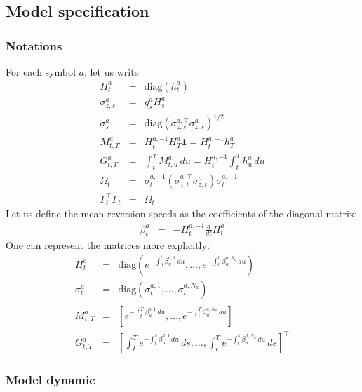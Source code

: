 \documentclass[11pt,english]{amsart}
\newcommand{\diag}{\mathrm{diag}}
\newcommand{\vun}{\mathbf{1}}
\theoremstyle{definition}
\begin{document}
\subsection{Model specification}%


\subsubsection{Notations}

For each symbol $a$, let us write
\begin{eqnarray}
  H^a_{t} &=& \diag(h^a_t)  \\
  \sigma^a_{z,s} &=& g^a_sH^a_s  \\ 
  \sigma^a_{s} &=& \diag\left( \sigma^{a,\top}_{z,s}  \sigma^a_{z,s}\right)^{1/2}  \\ 
  M^a_{t,T} &=& H^{a,-1}_t H^a_T  \vun = H^{a,-1}_t h^a_T  \\
  G^a_{t,T} &=& \int_t^T M^a_{t,u} \, du = H^{a,-1}_t \int_t^T h^a_u \, du \\
  \Omega_t &=& \sigma^{a,-1}_{t}  \left( \sigma^{a,\top}_{z,t}  \sigma^a_{z,t}\right)  \sigma^{a,-1}_{t}   \\
  \Gamma^\top_t\Gamma_t &=& \Omega_t 
\end{eqnarray}
Let us define the mean reversion speeds as the coefficients of the diagonal matrix: 
\begin{eqnarray}
  \beta^a_{t} &=&  - H^{a,-1}_{t} \frac{d}{dt}H^a_{t}  
\end{eqnarray}
One can represent the matrices more explicitly:
\begin{eqnarray}
  H^a_{t} &=& \diag\left( e^{-\int_0^t \beta^{a,1}_u \, du} , \ldots, e^{-\int_0^t \beta^{a,N_a}_u \, du} \right)  \\
  \sigma^a_{t} &=& \diag\left( \sigma^{a,1}_t  , \ldots, \sigma^{a,N_a}_t \right)  \\
  M^a_{t,T} &=& \left[ e^{-\int_t^T \beta^{a,1}_u \, du} , \ldots, e^{-\int_t^T \beta^{a,N_a}_u \, du} \right]^\top  \\
  G^a_{t,T} &=& \left[ \int_t^T e^{-\int_t^s \beta^{a,1}_u \, du} \, ds , \ldots,  \int_t^T e^{-\int_t^s \beta^{a,N_a}_u \, du} \, ds \right]^\top  
\end{eqnarray}





\subsubsection{Model dynamic}%
\end{document}
